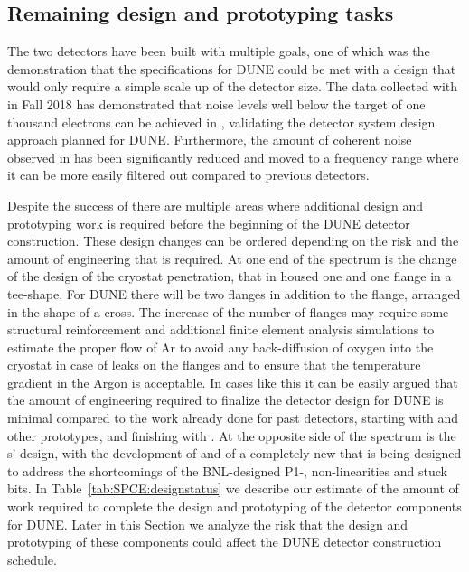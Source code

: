 \subsection{Remaining design and prototyping tasks}
\label{sec:fdsp-tpcelec-overview-remaining}

The two  detectors have been built with multiple
goals, one of which was the demonstration that the specifications
for DUNE could be met with a design that would only require a simple
scale up of the detector size. The data collected with 
in Fall 2018 has demonstrated that noise levels well below the target
of one thousand electrons can be achieved in \lar, validating the
detector system design approach planned for DUNE. Furthermore, the amount
of coherent noise observed in  has been significantly
reduced and moved to a frequency range where it can be more easily
filtered out compared to previous \lar detectors.

Despite the success of  there are multiple areas where
additional design and prototyping work is required before the
beginning of the DUNE detector construction. These design changes
can be ordered depending on the risk and the amount of engineering
that is required. At one end of the spectrum is the change of the
design of the cryostat penetration, that in  housed one
 and one  flange in a tee-shape. For DUNE
there will be two  flanges in addition to the 
flange, arranged in the shape of a cross. The increase of the number
of flanges may require some structural reinforcement and additional
finite element analysis simulations to estimate the proper flow of
Ar to avoid any back-diffusion of oxygen into the cryostat in case
of leaks on the flanges and to ensure that the temperature gradient
in the Argon is acceptable. In cases like this it can be easily
argued that the amount of engineering required to finalize the
detector design for DUNE is minimal compared to the work already
done for past \lar detectors, starting with \microboone and
other prototypes, and finishing with . At the opposite
side of the spectrum is the s' design, with the
development of  and of a completely new 
that is being designed to address the shortcomings of the BNL-designed
P1-, non-linearities and stuck bits. In Table~\ref{tab:SPCE:designstatus}
we describe our estimate of the amount of work required to complete
the design and prototyping of the  detector components for
DUNE. Later in this Section we analyze the risk that the design
and prototyping of these components could affect the DUNE detector
construction schedule.

